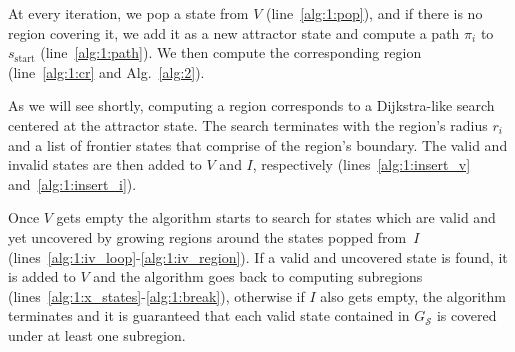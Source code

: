 \documentclass[letterpaper]{article} %
\newcommand{\calS}{\ensuremath{\mathcal{S}}\xspace}
\newcommand{\sStart}{\ensuremath{s_{\text{start}}\xspace}}
\begin{document}
At every iteration, we pop a state from $V$ (line~\ref{alg:1:pop}), and if there is no region covering it, we add it as a new attractor state and compute a path $\pi_i$ to $\sStart$ (line~\ref{alg:1:path}).
We then compute the corresponding region (line~\ref{alg:1:cr} and Alg.~\ref{alg:2}).

As we will see shortly, computing a region corresponds to a Dijkstra-like search centered at the attractor state.
The search terminates with the region's radius $r_i$ and a list of frontier states that comprise of the region's boundary.
The valid and invalid states are then added to $V$ and $I$, respectively (lines~\ref{alg:1:insert_v} and~\ref{alg:1:insert_i}).


Once $V$ gets empty the algorithm starts to search for states which are valid and yet uncovered by growing regions around the states popped from~$I$ (lines~\ref{alg:1:iv_loop}-\ref{alg:1:iv_region}). If a valid and uncovered state is found, it is added to $V$ and the algorithm goes back to computing subregions (lines~\ref{alg:1:x_states}-\ref{alg:1:break}), otherwise if $I$ also gets empty, the algorithm terminates and it is guaranteed that each valid state contained in $G_\calS$ is covered under at least one subregion.
\end{document}

